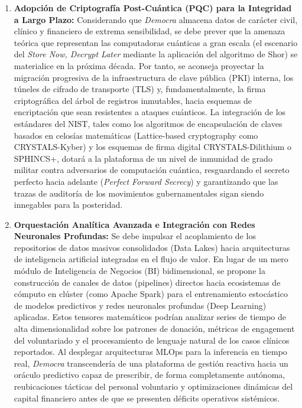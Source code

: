 \begin{enumerate}
    \item \textbf{Adopción de Criptografía Post-Cuántica (PQC) para la Integridad a Largo Plazo:}
    Considerando que \textit{Democra} almacena datos de carácter civil, clínico y financiero de extrema sensibilidad, se debe prever que la amenaza teórica que representan las computadoras cuánticas a gran escala (el escenario del \textit{Store Now, Decrypt Later} mediante la aplicación del algoritmo de Shor) se materialice en la próxima década. Por tanto, se aconseja proyectar la migración progresiva de la infraestructura de clave pública (PKI) interna, los túneles de cifrado de transporte (TLS) y, fundamentalmente, la firma criptográfica del árbol de registros inmutables, hacia esquemas de encriptación que sean resistentes a ataques cuánticos. La integración de los estándares del NIST, tales como los algoritmos de encapsulación de claves basados en celosías matemáticas (Lattice-based cryptography como CRYSTALS-Kyber) y los esquemas de firma digital CRYSTALS-Dilithium o SPHINCS+, dotará a la plataforma de un nivel de inmunidad de grado militar contra adversarios de computación cuántica, resguardando el secreto perfecto hacia adelante (\textit{Perfect Forward Secrecy}) y garantizando que las trazas de auditoría de los movimientos gubernamentales sigan siendo innegables para la posteridad.

    \item \textbf{Orquestación Analítica Avanzada e Integración con Redes Neuronales Profundas:}
    Se debe impulsar el acoplamiento de los repositorios de datos masivos consolidados (Data Lakes) hacia arquitecturas de inteligencia artificial integradas en el flujo de valor. En lugar de un mero módulo de Inteligencia de Negocios (BI) bidimensional, se propone la construcción de canales de datos (pipelines) directos hacia ecosistemas de cómputo en clúster (como Apache Spark) para el entrenamiento estocástico de modelos predictivos y redes neuronales profundas (Deep Learning) aplicadas. Estos tensores matemáticos podrían analizar series de tiempo de alta dimensionalidad sobre los patrones de donación, métricas de engagement del voluntariado y el procesamiento de lenguaje natural de los casos clínicos reportados. Al desplegar arquitecturas MLOps para la inferencia en tiempo real, \textit{Democra} transcendería de una plataforma de gestión reactiva hacia un oráculo predictivo capaz de prescribir, de forma completamente autónoma, reubicaciones tácticas del personal voluntario y optimizaciones dinámicas del capital financiero antes de que se presenten déficits operativos sistémicos.


\end{enumerate}
